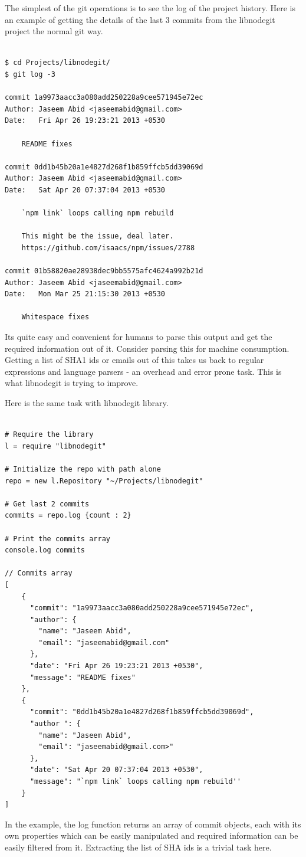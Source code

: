 The simplest of the git operations is to see the log of the project history.
Here is an example of getting the details of the last 3 commits from the
libnodegit project the normal git way.

\begin{verbatim}

$ cd Projects/libnodegit/
$ git log -3

commit 1a9973aacc3a080add250228a9cee571945e72ec
Author: Jaseem Abid <jaseemabid@gmail.com>
Date:   Fri Apr 26 19:23:21 2013 +0530

    README fixes

commit 0dd1b45b20a1e4827d268f1b859ffcb5dd39069d
Author: Jaseem Abid <jaseemabid@gmail.com>
Date:   Sat Apr 20 07:37:04 2013 +0530

    `npm link` loops calling npm rebuild

    This might be the issue, deal later.
    https://github.com/isaacs/npm/issues/2788

commit 01b58820ae28938dec9bb5575afc4624a992b21d
Author: Jaseem Abid <jaseemabid@gmail.com>
Date:   Mon Mar 25 21:15:30 2013 +0530

    Whitespace fixes

\end{verbatim}

Its quite easy and convenient for humans to parse this output and get the
required information out of it. Consider parsing this for machine consumption.
Getting a list of SHA1 ids or emails out of this takes us back to regular
expressions and language parsers - an overhead and error prone task. This is
what libnodegit is trying to improve.

Here is the same task with libnodegit library.

\begin{verbatim}

# Require the library
l = require "libnodegit"

# Initialize the repo with path alone
repo = new l.Repository "~/Projects/libnodegit"

# Get last 2 commits
commits = repo.log {count : 2}

# Print the commits array
console.log commits

// Commits array
[
    {
      "commit": "1a9973aacc3a080add250228a9cee571945e72ec",
      "author": {
        "name": "Jaseem Abid",
        "email": "jaseemabid@gmail.com"
      },
      "date": "Fri Apr 26 19:23:21 2013 +0530",
      "message": "README fixes"
    },
    {
      "commit": "0dd1b45b20a1e4827d268f1b859ffcb5dd39069d",
      "author ": {
        "name": "Jaseem Abid",
        "email": "jaseemabid@gmail.com>"
      },
      "date": "Sat Apr 20 07:37:04 2013 +0530",
      "message": "`npm link` loops calling npm rebuild''
    }
]

\end{verbatim}

In the example, the log function returns an array of commit objects, each with
its own properties which can be easily manipulated and required information can
be easily filtered from it. Extracting the list of SHA ids is a trivial task
here.
